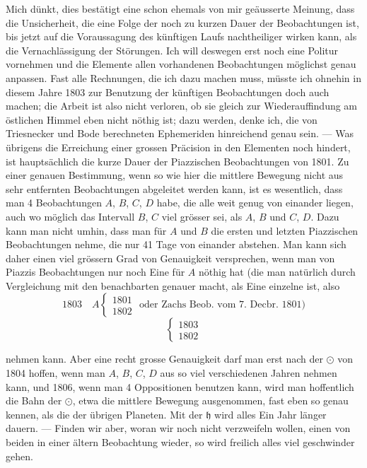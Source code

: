 \documentclass[12pt,a4paper]{article}
\newcommand{\Ceres}{\odot}
\newcommand{\Jupiter}{\mathfrak{h}}
\begin{document}
Mich dünkt, dies bestätigt eine schon ehemals von mir geäusserte Meinung, dass die Unsicherheit, die eine Folge der noch zu kurzen Dauer der Beobachtungen ist, bis jetzt auf die Voraussagung des künftigen Laufs nachtheiliger wirken kann, als die Vernachlässigung der Störungen. Ich will deswegen erst noch eine Politur vornehmen und die Elemente allen vorhandenen Beobachtungen möglichst genau anpassen. Fast alle Rechnungen, die ich dazu machen muss, müsste ich ohnehin in diesem Jahre 1803 zur Benutzung der künftigen Beobachtungen doch auch machen; die Arbeit ist also nicht verloren, ob sie gleich zur Wiederauffindung am östlichen Himmel eben nicht nöthig ist; dazu werden, denke ich, die von Triesnecker und Bode berechneten Ephemeriden hinreichend genau sein. --- Was übrigens die Erreichung einer grossen Präcision in den Elementen noch hindert, ist hauptsächlich die kurze Dauer der Piazzischen Beobachtungen von 1801. Zu einer genauen Bestimmung, wenn so wie hier die mittlere Bewegung nicht aus sehr entfernten Beobachtungen abgeleitet werden kann, ist es wesentlich, dass man 4 Beobachtungen $A$, $B$, $C$, $D$ habe, die alle weit genug von einander liegen, auch wo möglich das Intervall $B$, $C$ viel grösser sei, als $A$, $B$ und $C$, $D$. Dazu kann man nicht umhin, dass man für $A$ und $B$ die ersten und letzten Piazzischen Beobachtungen nehme, die nur 41 Tage von einander abstehen. Man kann sich daher einen viel grössern Grad von Genauigkeit versprechen, wenn man von Piazzis Beobachtungen nur noch Eine für $A$ nöthig hat (die man natürlich durch Vergleichung mit den benachbarten genauer macht, als Eine einzelne ist, also
\[\text{1803}\quad A\begin{cases}1801\\1802\end{cases} \text{ oder Zachs Beob. vom 7.~Decbr.~1801)}\]
\[\begin{cases}1803\\1802\end{cases}\]

\newpage
\setcounter{page}{409}
%
nehmen kann. Aber eine recht grosse Genauigkeit darf man erst nach der $\Ceres$ von 1804 hoffen, wenn man $A$, $B$, $C$, $D$ aus so viel verschiedenen Jahren nehmen kann, und 1806, wenn man 4 Oppositionen benutzen kann, wird man hoffentlich die Bahn der $\Ceres$, etwa die mittlere Bewegung ausgenommen, fast eben so genau kennen, als die der übrigen Planeten. Mit der $\Jupiter$ wird alles Ein Jahr länger dauern. --- Finden wir aber, woran wir noch nicht verzweifeln wollen, einen von beiden in einer ältern Beobachtung wieder, so wird freilich alles viel geschwinder gehen.
\end{document}
